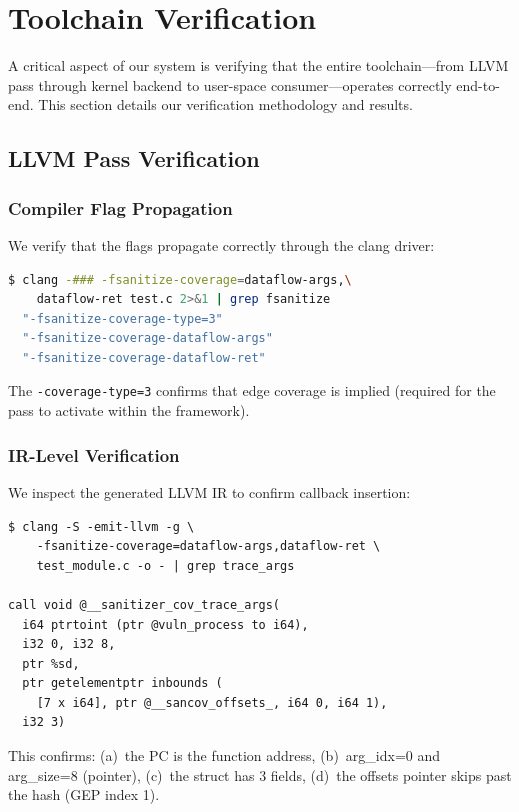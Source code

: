 \documentclass{ndss}
\begin{document}
\section{Toolchain Verification}\label{sec:toolchain}

A critical aspect of our system is verifying that the entire toolchain---from
LLVM pass through kernel backend to user-space consumer---operates correctly
end-to-end. This section details our verification methodology and results.

\subsection{LLVM Pass Verification}

\subsubsection{Compiler Flag Propagation}

We verify that the flags propagate correctly through the clang driver:
\begin{lstlisting}[language=bash,numbers=none]
$ clang -### -fsanitize-coverage=dataflow-args,\
    dataflow-ret test.c 2>&1 | grep fsanitize
  "-fsanitize-coverage-type=3"
  "-fsanitize-coverage-dataflow-args"
  "-fsanitize-coverage-dataflow-ret"
\end{lstlisting}

The \texttt{-coverage-type=3} confirms that edge coverage is implied (required
for the pass to activate within the \sancov framework).

\subsubsection{IR-Level Verification}

We inspect the generated LLVM IR to confirm callback insertion:
\begin{lstlisting}[numbers=none]
$ clang -S -emit-llvm -g \
    -fsanitize-coverage=dataflow-args,dataflow-ret \
    test_module.c -o - | grep trace_args

call void @__sanitizer_cov_trace_args(
  i64 ptrtoint (ptr @vuln_process to i64),
  i32 0, i32 8,
  ptr %sd,
  ptr getelementptr inbounds (
    [7 x i64], ptr @__sancov_offsets_, i64 0, i64 1),
  i32 3)
\end{lstlisting}

This confirms: (a)~the PC is the function address, (b)~arg\_idx=0 and
arg\_size=8 (pointer), (c)~the struct has 3 fields, (d)~the offsets pointer
skips past the hash (GEP index 1).
\end{document}
